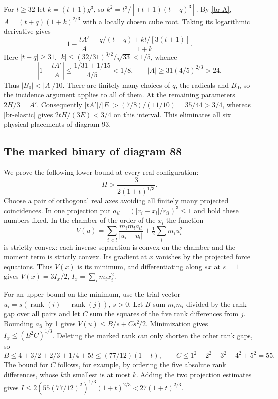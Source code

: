 \documentclass[11pt,letterpaper]{article}
\theoremstyle{definition}
\begin{document}
For $t\ge32$ let $k=(t+1)g^3$, so
$k^2=t^3/[(t+1)(t+q)^3]$. By \eqref{br-A},
$A=(t+q)(1+k)^{2/3}$ with a locally chosen cube root.
Taking its logarithmic derivative gives
\[
 1-\frac{t A'}{A}=\frac{q/(t+q)+kt/[3(t+1)]}{1+k}.
\]
Here $|t+q|\ge31$, $|k|\le(32/31)^{3/2}/\sqrt{33}<1/5$, whence
\[
 \left|1-\frac{tA'}{A}\right|
 \le\frac{1/31+1/15}{4/5}<1/8,\qquad |A|\ge31(4/5)^{2/3}>24 .
\]
Thus $|B_0|<|A|/10$. There are finitely many choices of $q$, the
radicals and $B_0$, so the incidence argument applies to all of them.
At the remaining parameters $2H/3=A'$. Consequently
$|tA'|/|E|>(7/8)/(11/10)=35/44>3/4$, whereas
\eqref{br-elastic} gives $2tH/(3E)<3/4$ on this interval.
This eliminates all six physical placements of diagram 93.

\subsection{The marked binary of diagram 88}
\label{br-markbinary}
We prove the following lower bound at every real configuration:
\begin{equation}\label{br-Hb}
 H>\frac{3}{2(1+t)^{1/3}} .
\end{equation}
Choose a pair of orthogonal real axes avoiding all finitely many
projected coincidences. In one projection put
$a_{il}=(|x_i-x_l|/r_{il})^3\le1$ and hold these numbers fixed.
In the chamber of the order of the $x_i$ the function
\[
 V(u)=\sum_{i<l}\frac{m_im_la_{il}}{|u_i-u_l|}
       +\tfrac12\sum_i m_i u_i^2
\]
is strictly convex: each inverse separation is convex on the chamber
and the moment term is strictly convex. Its gradient at $x$ vanishes
by the projected force equations. Thus $V(x)$ is its minimum, and
differentiating along $s x$ at $s=1$ gives
$V(x)=3I_x/2$, $I_x=\sum_i m_i x_i^2$.

For an upper bound on the minimum, use the trial vector
$u_i=s(\operatorname{rank}(i)-\operatorname{rank}(j))$, $s>0$.
Let $B$ sum $m_im_l$ divided by the rank gap over all pairs and let $C$
sum the squares of the five rank differences from $j$. Bounding
$a_{il}$ by 1 gives $V(u)\le B/s+Cs^2/2$.
Minimization gives $I_x\le(B^2C)^{1/3}$. Deleting the marked rank
can only shorten the other rank gaps, so
\[
 B\le4+3/2+2/3+1/4+5t\le(77/12)(1+t),\qquad
 C\le1^2+2^2+3^2+4^2+5^2=55 .
\]
The bound for $C$ follows, for example, by ordering the five absolute
rank differences, whose $k$th smallest is at most $k$.
Adding the two projection estimates gives
$I\le2(55(77/12)^2)^{1/3}(1+t)^{2/3}<27(1+t)^{2/3}$.
\end{document}
